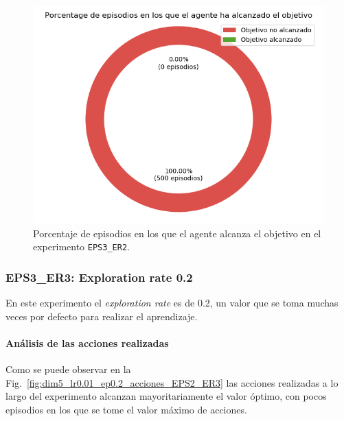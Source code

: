 \begin{figure}
    \centering
    \includegraphics[scale=0.4]{cap5_experimentacion/images/dim5_lr0-01_ep0.1_porcentajeResuelto.png}
    \caption{Porcentaje de episodios en los que el agente alcanza el objetivo en el experimento \texttt{EPS3\_ER2}.}
    \label{fig:dim5_lr0-01_ep0.1_porcentajeResuelto}
\end{figure}

\subsubsection{EPS3\_ER3: Exploration rate 0.2} \label{EPS3_ER3}

En este experimento el \textit{exploration rate} es de 0.2, un valor que se toma muchas veces por defecto para realizar el aprendizaje. 

\paragraph{Análisis de las acciones realizadas}

Como se puede observar en la Fig.~\ref{fig:dim5_lr0.01_ep0.2_acciones_EPS2_ER3} las acciones realizadas a lo largo del experimento alcanzan mayoritariamente el valor óptimo, con pocos episodios en los que se tome el valor máximo de acciones. \\

